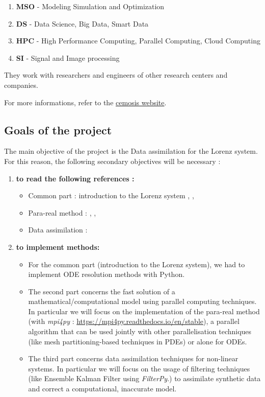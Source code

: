 \documentclass[12pt]{article}
\begin{document}
	\begin{enumerate}[label=\textbullet]
		\item \textbf{MSO} - Modeling Simulation and Optimization
		\item \textbf{DS} -	Data Science, Big Data, Smart Data
		\item \textbf{HPC} - High Performance Computing, Parallel Computing, Cloud Computing
		\item \textbf{SI} - Signal and Image processing
	\end{enumerate}
	\noindent They work with researchers and engineers of other research centers and companies.
	
	\noindent For more informations, refer to the \href{http://www.cemosis.fr/}{cemosis website}. 
	
	\newpage
	
	\subsection{Goals of the project}
	
	 The main objective of the project is the Data assimilation for the Lorenz system. For this reason, the following secondary objectives will be necessary :
 
 	\begin{enumerate}[label=\textbullet]
 		\item \textbf{to read the following references :}
 		\begin{itemize}
 			\item Common part : introduction to the Lorenz system  \cite{partie1_ref1},  \cite{partie1_ref2},  \cite{partie1_ref3}
 			\item Para-real method : \cite{partie2_ref1}, \cite{partie2_ref2},  \cite{partie2_ref3}
 			\item Data assimilation :\cite{partie3_ref2}
 		\end{itemize}
 		\item \textbf{to implement methods:} 
 		\begin{itemize}
 			\item For the common part (introduction to the Lorenz system), we had to implement ODE resolution methods with Python.
 			\item The second part concerns the fast solution of a mathematical/computational model using parallel computing techniques. In particular we will focus on the implementation of the para-real method (with \textit{mpi4py} : \url{https://mpi4py.readthedocs.io/en/stable}), a parallel algorithm that can be used jointly with other parallelisation  techniques (like mesh partitioning-based techniques in PDEs) or alone for ODEs.
 			\item The third part concerns data assimilation techniques for non-linear systems. In particular we will focus on the usage of filtering techniques (like Ensemble Kalman Filter using \textit{FilterPy}.) to assimilate synthetic data and correct a computational, inaccurate model.
 		\end{itemize}
 	\end{enumerate}
	
\end{document}
